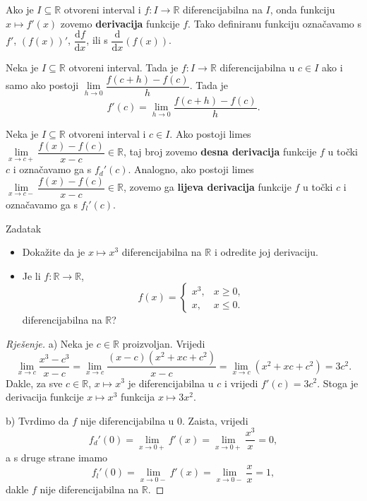 Ako je \(I\subseteq \mathbb{R}\) otvoreni interval i \(f : I\to \mathbb{R}\) diferencijabilna na \(I\), onda funkciju \(x\mapsto f'(x)\) zovemo \textbf{derivacija} funkcije \(f\). Tako definiranu funkciju označavamo s \(f'\), \(\left(f(x)\right)'\), \(\dfrac{\mathrm{d}f}{\mathrm{d}x}\), ili s \(\dfrac{\mathrm{d}}{\mathrm{d}x}\left(f(x)\right)\).
\begin{remark}
Neka je \(I\subseteq \mathbb{R}\) otvoreni interval. Tada je \(f : I\to \mathbb{R}\) diferencijabilna u \(c\in I\) ako i samo ako postoji \(\lim\limits_{h\to 0}{\dfrac{f(c+h)-f(c)}{h}}\). Tada je
\[f'(c)=\lim\limits_{h\to 0}{\dfrac{f(c+h)-f(c)}{h}}.\]
\end{remark}
\begin{definition} Neka je \(I\subseteq \mathbb{R}\) otvoreni interval i \(c\in I\). Ako postoji limes \(\lim\limits_ {x\to c+}{\dfrac{f(x)-f(c)}{x-c}}\in \mathbb{R}\), taj broj zovemo \textbf{desna derivacija} funkcije \(f\) u točki \(c\) i označavamo ga s \(f_d'(c)\). Analogno, ako postoji limes \(\lim\limits_ {x\to c-}{\dfrac{f(x)-f(c)}{x-c}}\in \mathbb{R}\), zovemo ga \textbf{lijeva derivacija} funkcije \(f\) u točki \(c\) i označavamo ga s \(f_l'(c)\).
\end{definition}
\begin{exercise}{Zadatak} \textbf{}
\label{firstder}
\begin{itemize}
\item[a)] Dokažite da je \(x\mapsto x^3\) diferencijabilna na \(\mathbb{R}\) i odredite joj derivaciju.
\item[b)] Je li \(f : \mathbb{R}\to \mathbb{R}\),
\[f(x)=\begin{cases}
x^3, & x\geq 0,\\
x, & x\leq 0.
\end{cases}\]
diferencijabilna na \(\mathbb{R}\)?
\end{itemize}
\end{exercise}
\begin{proof}[Rješenje]
a) Neka je \(c\in \mathbb{R}\) proizvoljan. Vrijedi
\[\lim\limits_{x\to c}{\dfrac{x^3-c^3}{x-c}}=\lim\limits_{x\to c}{\dfrac{(x-c)(x^2+xc+c^2)}{x-c}}=\lim\limits_{x\to c}{\left(x^2+xc+c^2\right)}=3c^2.\]
Dakle, za sve \(c\in \mathbb{R}\), \(x\mapsto x^3\) je diferencijabilna u \(c\) i vrijedi \(f'(c)=3c^2\). Stoga je derivacija funkcije \(x\mapsto x^3\) funkcija \(x\mapsto 3x^2\).

b) Tvrdimo da \(f\) nije diferencijabilna u \(0\). Zaista, vrijedi \[f_d'(0)=\lim\limits_{x\to 0+}{f'(x)}=\lim\limits_{x\to 0+}{\dfrac{x^3}{x}}=0,\]
a s druge strane imamo 
\[f_l'(0)=\lim\limits_{x\to 0-}{f'(x)}=\lim\limits_{x\to 0-}{\dfrac{x}{x}}=1,\]
dakle \(f\) nije diferencijabilna na \(\mathbb{R}\).
\end{proof}

